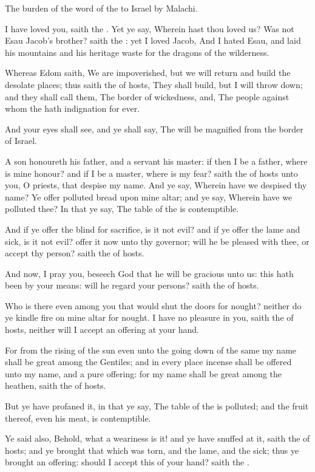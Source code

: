 \Chapter
\Verse The burden of the word of the \LORD to Israel by Malachi.

\Verse I have loved you, saith the \LORD. Yet ye say, Wherein hast thou loved us? Was not Esau Jacob's brother? saith the \LORD: yet I loved Jacob, \Verse And I hated Esau, and laid his mountains and his heritage waste for the dragons of the wilderness.

\Verse Whereas Edom saith, We are impoverished, but we will return and build the desolate places; thus saith the \LORD of hosts, They shall build, but I will throw down; and they shall call them, The border of wickedness, and, The people against whom the \LORD hath indignation for ever.

\Verse And your eyes shall see, and ye shall say, The \LORD will be magnified from the border of Israel.

\Verse A son honoureth his father, and a servant his master: if then I be a father, where is mine honour? and if I be a master, where is my fear? saith the \LORD of hosts unto you, O priests, that despise my name. And ye say, Wherein have we despised thy name?  \Verse Ye offer polluted bread upon mine altar; and ye say, Wherein have we polluted thee? In that ye say, The table of the \LORD is contemptible.

\Verse And if ye offer the blind for sacrifice, is it not evil? and if ye offer the lame and sick, is it not evil? offer it now unto thy governor; will he be pleased with thee, or accept thy person? saith the \LORD of hosts.

\Verse And now, I pray you, beseech God that he will be gracious unto us: this hath been by your means: will he regard your persons? saith the \LORD of hosts.

\Verse Who is there even among you that would shut the doors for nought?  neither do ye kindle fire on mine altar for nought. I have no pleasure in you, saith the \LORD of hosts, neither will I accept an offering at your hand.

\Verse For from the rising of the sun even unto the going down of the same my name shall be great among the Gentiles; and in every place incense shall be offered unto my name, and a pure offering: for my name shall be great among the heathen, saith the \LORD of hosts.

\Verse But ye have profaned it, in that ye say, The table of the \LORD is polluted; and the fruit thereof, even his meat, is contemptible.

\Verse Ye said also, Behold, what a weariness is it! and ye have snuffed at it, saith the \LORD of hosts; and ye brought that which was torn, and the lame, and the sick; thus ye brought an offering: should I accept this of your hand? saith the \LORD.


